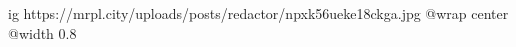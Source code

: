  
 
 
 
 

\ifcmt
  ig https://mrpl.city/uploads/posts/redactor/npxk56ueke18ckga.jpg
  @wrap center
  @width 0.8
\fi
